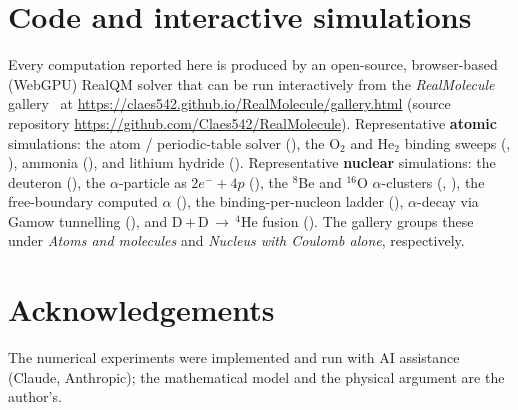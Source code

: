 \documentclass[11pt]{article}
\begin{document}
\section*{Code and interactive simulations}
\sloppy
Every computation reported here is produced by an open-source, browser-based (WebGPU) RealQM solver
that can be run interactively from the \emph{RealMolecule} gallery~\cite{Gallery} at
\url{https://claes542.github.io/RealMolecule/gallery.html} (source repository
\url{https://github.com/Claes542/RealMolecule}). Representative \textbf{atomic}
simulations: the atom / periodic-table solver (), the O$_2$ and He$_2$
binding sweeps (, ), ammonia (), and
lithium hydride (). Representative \textbf{nuclear} simulations: the deuteron
(), the $\alpha$-particle as $2e^-+4p$ (),
the $^8$Be and $^{16}$O $\alpha$-clusters (,
), the free-boundary computed $\alpha$
(), the binding-per-nucleon ladder (),
$\alpha$-decay via Gamow tunnelling (), and D\,$+$\,D\,$\to\,^4$He
fusion (). The gallery groups these under \emph{Atoms and
molecules} and \emph{Nucleus with Coulomb alone}, respectively.
\fussy

\section*{Acknowledgements}
The numerical experiments were implemented and run with AI assistance (Claude, Anthropic); the
mathematical model and the physical argument are the author's.
\end{document}
